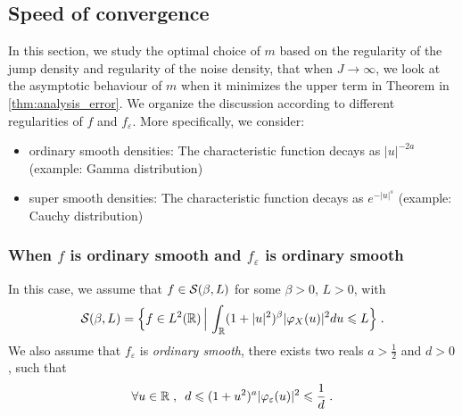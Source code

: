 
\subsection{Speed of convergence}
\label{s:speed_cv_one}

In this section, we study the optimal choice of $m$ based on the regularity of the jump density and regularity of the noise density, \ie that when $J \to \infty$, we look at the asymptotic behaviour of $m$ when it minimizes the upper term in Theorem in \ref{thm:analysis_error}. We organize the discussion according to different regularities of $f$ and $f_\varepsilon$. More specifically, we consider:
	\begin{itemize}
		\item ordinary smooth densities: The characteristic function decays as $|u|^{-2a}$ (example: Gamma distribution)
		\item super smooth densities: The characteristic function decays as $e^{-|u|^s}$ (example: Cauchy distribution)
	\end{itemize}

	
\subsubsection*{When $f$ is ordinary smooth and $f_\varepsilon$ is ordinary smooth}\label{sec:smoothsmooth}

In this case, we assume that $f \in \mathcal{S}(\beta, L)$ for some $\beta > 0$, $L > 0$, with
	\begin{equation*}
	\mathcal{S}(\beta, L) 
	= 
	\Big\{ f \in L^2(\mathbb{R}) \, \Big| \, \int_{\mathbb{R}} (1 + |u|^2)^{\beta} |\varphi_X(u)|^2 du \leqslant L \Big\}
	\; .
	\end{equation*}
We also assume that $f_\varepsilon$ is \textit{ordinary smooth}, \ie there exists two reals $a > \frac{1}{2}$ and $d > 0$, such that 
	\begin{equation*}
	\forall u \in \mathbb{R} 
	\; , \enspace
	d \leqslant (1+u^2)^a |\varphi_\varepsilon(u)|^2 \leqslant \frac{1}{d}
	\; .
	\end{equation*}

